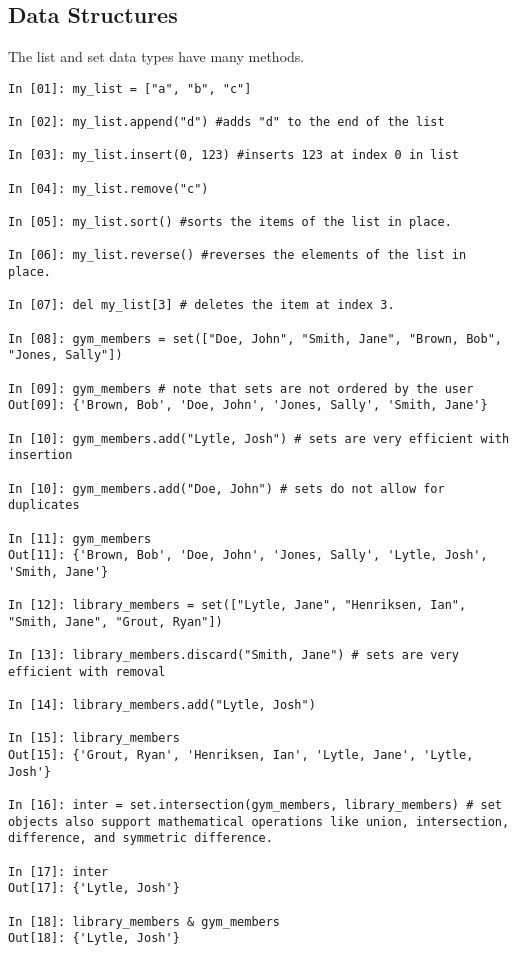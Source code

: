 \subsection*{Data Structures}
\begin{example}
The list and set data types have many methods. 
\begin{lstlisting}
In [01]: my_list = ["a", "b", "c"]

In [02]: my_list.append("d") #adds "d" to the end of the list

In [03]: my_list.insert(0, 123) #inserts 123 at index 0 in list

In [04]: my_list.remove("c")

In [05]: my_list.sort() #sorts the items of the list in place.

In [06]: my_list.reverse() #reverses the elements of the list in place. 

In [07]: del my_list[3] # deletes the item at index 3.

In [08]: gym_members = set(["Doe, John", "Smith, Jane", "Brown, Bob", "Jones, Sally"])

In [09]: gym_members # note that sets are not ordered by the user
Out[09]: {'Brown, Bob', 'Doe, John', 'Jones, Sally', 'Smith, Jane'}

In [10]: gym_members.add("Lytle, Josh") # sets are very efficient with insertion

In [10]: gym_members.add("Doe, John") # sets do not allow for duplicates

In [11]: gym_members
Out[11]: {'Brown, Bob', 'Doe, John', 'Jones, Sally', 'Lytle, Josh', 'Smith, Jane'}

In [12]: library_members = set(["Lytle, Jane", "Henriksen, Ian", "Smith, Jane", "Grout, Ryan"])

In [13]: library_members.discard("Smith, Jane") # sets are very efficient with removal

In [14]: library_members.add("Lytle, Josh") 

In [15]: library_members
Out[15]: {'Grout, Ryan', 'Henriksen, Ian', 'Lytle, Jane', 'Lytle, Josh'}

In [16]: inter = set.intersection(gym_members, library_members) # set objects also support mathematical operations like union, intersection, difference, and symmetric difference.

In [17]: inter
Out[17]: {'Lytle, Josh'}

In [18]: library_members & gym_members 
Out[18]: {'Lytle, Josh'}


\end{lstlisting}

\end{example}


